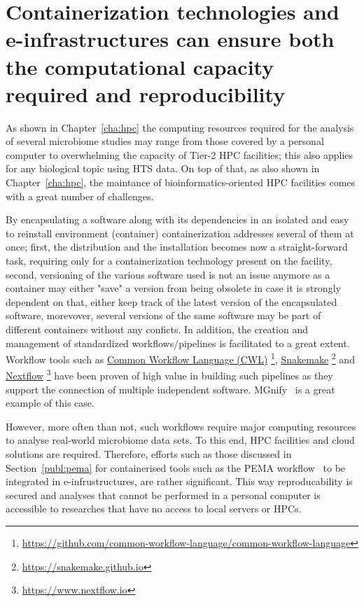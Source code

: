 \section{Containerization technologies and e-infrastructures can ensure both the computational capacity 
         required and reproducibility}
\label{chap:compute}

   As shown in Chapter~\ref{cha:hpc} the computing resources required for the analysis of several 
   microbiome studies may range from those covered by a personal computer to overwhelming the capacity
   of Tier-2 HPC facilities;
   this also applies for any biological topic using HTS data. 
   On top of that, as also shown in Chapter~\ref{cha:hpc}, the maintance of bioinformatics-oriented HPC facilities 
   comes with a great number of challenges. 

   By encapsulating a software along with its dependencies in an isolated and easy to reinstall environment (container) 
   containerization addresses several of them at once; 
   first, the distribution and the installation becomes now a straight-forward task, requiring only for a containerization technology 
   present on the facility,
   second, versioning of the various software used is not an issue anymore as a container may either "save" a version from being obsolete
   in case it is strongly dependent on that, either keep track of the latest version of the encapsulated software, 
   morevover, several versions of the same software may be part of different containers without any conficts.
   In addition, the creation and management of standardized workflows/pipelines is facilitated to a great extent. 
   Workflow tools such as 
   \href{https://github.com/common-workflow-language/common-workflow-language}{Common Workflow Language (CWL)}
   \footnote{\href{https://github.com/common-workflow-language/common-workflow-language}{https://github.com/common-workflow-language/common-workflow-language}}, 
   \href{https://snakemake.github.io}{Snakemake} 
   \footnote{\href{https://snakemake.github.io}{https://snakemake.github.io}}
   and 
   \href{https://www.nextflow.io}{Nextflow}
   \footnote{\href{https://www.nextflow.io}{https://www.nextflow.io}}
   have been proven of high value 
   in building such pipelines as they support the connection of multiple independent software.
   MGnify~\citep{mitchell2020mgnify} is a great example of this case. 

   However, more often than not, such workflows require major computing resources to analyse
   real-world microbiome data sets.
   To this end, HPC facilities and cloud solutions are required. 
   Therefore, efforts such as those discussed in Section~\ref{publ:pema} 
   for containerised tools such as the PEMA workflow~\citep{zafeiropoulos2020pema}
   to be integrated in e-infrustructures, are rather significant. 
   This way reproducability is secured and analyses that cannot be performed in a personal computer
   is accessible to researches that have no access to local servers or HPCs. 



